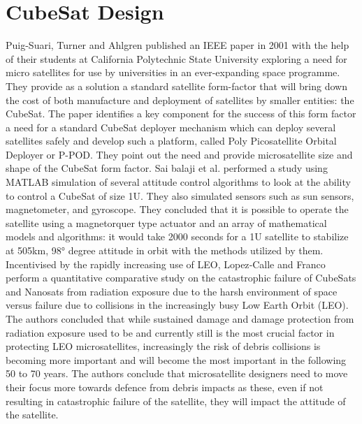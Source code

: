 \section{CubeSat Design}
Puig-Suari, Turner and Ahlgren published an IEEE paper in 2001 with the help of their students at California Polytechnic State University exploring a need for micro satellites for use by universities in an ever-expanding space programme. They provide as a solution a standard satellite form-factor that will bring down the cost of both manufacture and deployment of satellites by smaller entities: the CubeSat. The paper identifies a key component for the success of this form factor a need for a standard CubeSat deployer mechanism which can deploy several satellites safely and develop such a platform, called Poly Picosatellite Orbital Deployer or P-POD. They point out the need and provide microsatellite size and shape of the CubeSat form factor.
Sai balaji et al. performed a study using MATLAB simulation of several attitude control algorithms to look at the ability to control a CubeSat of size 1U. They also simulated sensors such as sun sensors, magnetometer, and gyroscope. They concluded that it is possible to operate the satellite using a magnetorquer type actuator and an array of mathematical models and algorithms: it would take 2000 seconds for a 1U satellite to stabilize at 505km, 98° degree attitude in orbit with the methods utilized by them.
Incentivised by the rapidly increasing use of LEO, Lopez‑Calle and Franco perform a quantitative comparative study on the catastrophic failure of CubeSats and Nanosats from radiation exposure due to the harsh environment of space versus failure due to collisions in the increasingly busy Low Earth Orbit (LEO). The authors concluded that while sustained damage and damage protection from radiation exposure used to be and currently still is the most crucial factor in protecting LEO microsatellites, increasingly the risk of debris collisions is becoming more important and will become the most important in the following 50 to 70 years. The authors conclude that microsatellite designers need to move their focus more towards defence from debris impacts as these, even if not resulting in catastrophic failure of the satellite, they will impact the attitude of the satellite.